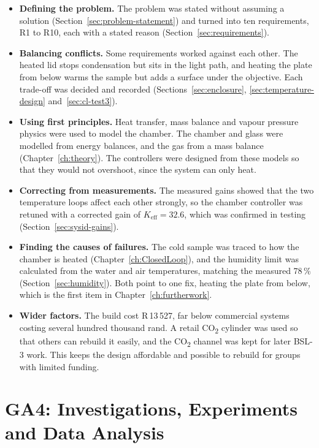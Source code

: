 \begin{itemize}[nosep]
    \item \textbf{Defining the problem.} The problem was stated without assuming a solution (Section~\ref{sec:problem-statement}) and turned into ten requirements, R1 to R10, each with a stated reason (Section~\ref{sec:requirements}).
    \item \textbf{Balancing conflicts.} Some requirements worked against each other. The heated lid stops condensation but sits in the light path, and heating the plate from below warms the sample but adds a surface under the objective. Each trade-off was decided and recorded (Sections~\ref{sec:enclosure}, \ref{sec:temperature-design} and~\ref{sec:cl-test3}).
    \item \textbf{Using first principles.} Heat transfer, mass balance and vapour pressure physics were used to model the chamber. The chamber and glass were modelled from energy balances, and the gas from a mass balance (Chapter~\ref{ch:theory}). The controllers were designed from these models so that they would not overshoot, since the system can only heat.
    \item \textbf{Correcting from measurements.} The measured gains showed that the two temperature loops affect each other strongly, so the chamber controller was retuned with a corrected gain of $K_\mathrm{eff} = 32.6$, which was confirmed in testing (Section~\ref{sec:sysid-gains}).
    \item \textbf{Finding the causes of failures.} The cold sample was traced to how the chamber is heated (Chapter~\ref{ch:ClosedLoop}), and the humidity limit was calculated from the water and air temperatures, matching the measured 78\,\% (Section~\ref{sec:humidity}). Both point to one fix, heating the plate from below, which is the first item in Chapter~\ref{ch:furtherwork}.
    \item \textbf{Wider factors.} The build cost R\,13\,527, far below commercial systems costing several hundred thousand rand. A retail CO\textsubscript{2} cylinder was used so that others can rebuild it easily, and the CO\textsubscript{2} channel was kept for later BSL-3 work. This keeps the design affordable and possible to rebuild for groups with limited funding.
\end{itemize}

\section{GA4: Investigations, Experiments and Data Analysis}
\label{app:ga4}

